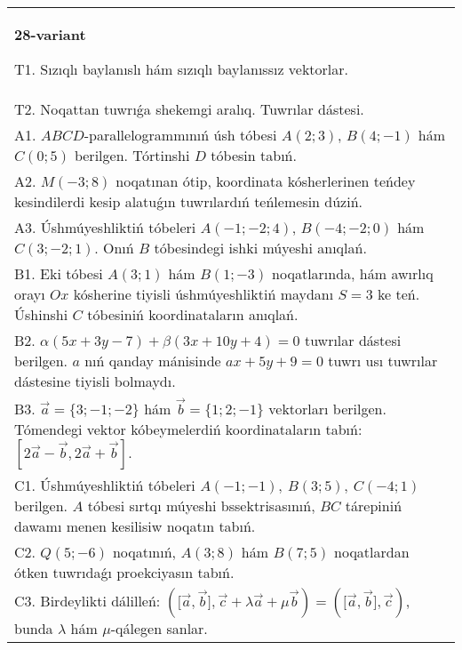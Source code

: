 \documentclass{article}
\begin{document}
\begin{tabular}{m{17cm}}
\textbf{28-variant}
\newline

T1. 
Sızıqlı baylanıslı hám sızıqlı baylanıssız vektorlar.
 \\
T2. 
Noqattan tuwrıǵa shekemgi aralıq. Tuwrılar dástesi.
 \\
A1. 
$ABCD$-parallelogrammınıń úsh tóbesi
$A(2;3)$, $B(4;-1)$ hám $C(0;5)$ berilgen. Tórtinshi $D$
tóbesin tabıń.
 \\
A2. 
$M(-3;8)$ noqatınan ótip, koordinata kósherlerinen
teńdey kesindilerdi kesip alatuǵın tuwrılardıń teńlemesin dúziń.
 \\
A3. 
Úshmúyeshliktiń tóbeleri
$A (- 1; - 2;4) $, $B (- 4; - 2;0) $ hám $C (3; - 2;1) $. Onıń $B$ tóbesindegi
ishki múyeshi anıqlań. 
 \\
B1. 
Eki tóbesi \(A(3;1)\) hám \(B(1;-3)\) noqatlarında, hám
awırlıq orayı $Ox$ kósherine tiyisli úshmúyeshliktiń maydanı
\(S=3\) ke teń. Úshinshi $C$ tóbesiniń koordinataların anıqlań. \\
B2. 
\(\alpha(5x+3y-7)+\beta(3x+10y+4)=0\) tuwrılar
dástesi berilgen. $a$ nıń qanday mánisinde \(ax+5y+9=0\)
tuwrı usı tuwrılar dástesine tiyisli bolmaydı. \\
B3. 
$\vec{a} = \{ 3; - 1; - 2\}$ hám $\vec{b} = \{ 1;2; - 1\}$ vektorları berilgen. Tómendegi vektor kóbeymelerdiń koordinataların tabıń: 
$\left\lbrack 2\vec{a} - \vec{b},2\vec{a} + \vec{b} \right\rbrack$.
 \\
C1. 
Úshmúyeshliktiń tóbeleri
\(A( - 1; - 1),\ B(3;5),\ C( - 4;1)\) berilgen. $A$ tóbesi sırtqı
múyeshi bssektrisasınıń, $BC$ tárepiniń dawamı menen kesilisiw
noqatın tabıń.
 \\
C2. 
\(Q(5; - 6)\) noqatınıń, \(A(3;8)\) hám \(B(7;5)\) 
noqatlardan ótken tuwrıdaǵı proekciyasın tabıń.
 \\
C3. 
Birdeylikti dálilleń: \((\lbrack\vec{a},\vec{b}\rbrack,\vec{c} + \lambda\vec{a} + \mu\vec{b}) = (\lbrack\vec{a},\vec{b}\rbrack,\vec{c})\), bunda \(\lambda\) hám \(\mu\)-qálegen sanlar.
 \\

\end{tabular}
\vspace{1cm}
\end{document}
